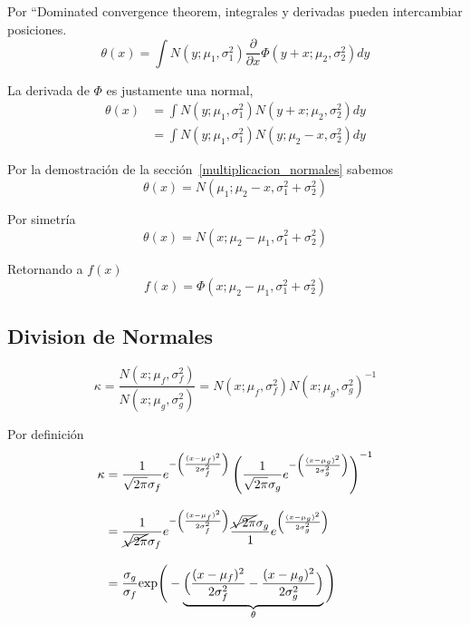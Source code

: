 \documentclass[article]{jss}
\begin{document}
\begin{appendix}
Por ``Dominated convergence theorem, integrales y derivadas pueden intercambiar posiciones.
\begin{equation}
 \theta(x) = \int N(y;\mu_1,\sigma_1^2)\frac{\partial}{\partial x}\Phi(y+x;\mu_2,\sigma_2^2) dy
\end{equation}

La derivada de $\Phi$ es justamente una normal,
\begin{equation}
\begin{split}
\theta(x) & = \int N(y;\mu_1,\sigma_1^2)N(y+x;\mu_2,\sigma_2^2) dy \\ 
& = \int N(y;\mu_1,\sigma_1^2)N(y;\mu_2-x,\sigma_2^2) dy 
\end{split}
\end{equation}

Por la demostraci\'on de la secci\'on~\ref{multiplicacion_normales} sabemos
\begin{equation}
 \theta(x) = N(\mu_1; \mu_2 - x, \sigma_1^2 + \sigma_2^2)
\end{equation}

Por simetr\'ia
\begin{equation}
 \theta(x) = N(x; \mu_2 - \mu_1, \sigma_1^2 + \sigma_2^2)
\end{equation}

Retornando a $f(x)$
\begin{equation}
 f(x) = \Phi(x; \mu_2 - \mu_1, \sigma_1^2 + \sigma_2^2)
\end{equation}

\subsection{Division de Normales}\label{sec:division_normales}

\begin{equation}
\kappa = \frac{N(x;\mu_f,\sigma_f^2)}{N(x;\mu_g,\sigma_g^2)} = N(x;\mu_f,\sigma_f^2)N(x;\mu_g,\sigma_g^2)^{-1}
\end{equation}

Por definici\'on
\begin{equation}
\begin{split}
\kappa & = \frac{1}{\sqrt{2\pi}\sigma_f}e^{-\left(\frac{(x-\mu_f)^2}{2\sigma_f^2}\right)} \left( \frac{1}{\sqrt{2\pi}\sigma_g}e^{-\left(\frac{(x-\mu_g)^2}{2\sigma_g^2}\right)} \right)^{-1} \\[0.3cm]
& = \frac{1}{\cancel{\sqrt{2\pi}}\sigma_f}e^{-\left(\frac{(x-\mu_f)^2}{2\sigma_f^2}\right)} \frac{\cancel{\sqrt{2\pi}}\sigma_g}{1} e^{\left(\frac{(x-\mu_g)^2}{2\sigma_g^2}\right)} \\[0.3cm]
& = \frac{\sigma_g}{\sigma_f}\text{exp}\Bigg(-\underbrace{\Big(\frac{(x-\mu_f)^2}{2\sigma_f^2} - \frac{(x-\mu_g)^2}{2\sigma_g^2}\Big)}_{\theta}\Bigg)
\end{split}
\end{equation}


\end{appendix}
\end{document}
